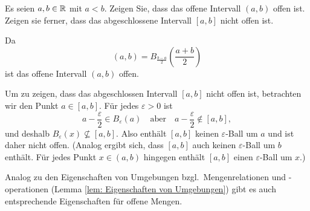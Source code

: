 \documentclass[a4paper,10pt]{article}
\begin{document}
\begin{question}
 Es seien $a,b \in \mathbb{R}$ mit $a < b$. Zeigen Sie, dass das offene Intervall $(a,b)$ offen ist. Zeigen sie ferner, dass das abgeschlossene Intervall $[a,b]$ nicht offen ist.
\end{question}
\begin{solution}
 Da
 \[
  (a,b) = B_{\frac{b-a}{2}}\left(\frac{a+b}{2}\right)
 \]
 ist das offene Intervall $(a,b)$ offen.
 
 Um zu zeigen, dass das abgeschlossen Intervall $[a,b]$ nicht offen ist, betrachten wir den Punkt $a \in [a,b]$. Für jedes $\varepsilon > 0$ ist
 \[
  a - \frac{\varepsilon}{2} \in B_\varepsilon(a)
  \quad
  \text{aber}
  \quad
  a - \frac{\varepsilon}{2} \notin [a,b],
 \]
 und deshalb $B_\varepsilon(x) \nsubseteq [a,b]$. Also enthält $[a,b]$ keinen $\varepsilon$-Ball um $a$ und ist daher nicht offen. (Analog ergibt sich, dass $[a,b]$ auch keinen $\varepsilon$-Ball um $b$ enthält. Für jedes Punkt $x \in (a,b)$ hingegen enthält $[a,b]$ einen $\varepsilon$-Ball um $x$.)
\end{solution}


Analog zu den Eigenschaften von Umgebungen bzgl.\ Mengenrelationen und -operationen (Lemma \ref{lem: Eigenschaften von Umgebungen}) gibt es auch entsprechende Eigenschaften für offene Mengen.
\end{document}
